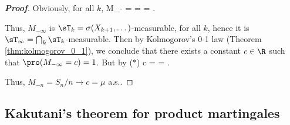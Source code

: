 \begin{proof}[\bf Proof]





Obviously, for all $k$,
\be
M_{-\infty} = \lim {} = \lim {} = \lim {}.
\ee

Thus, $M_{-\infty}$ is $\sT_k = \sigma(X_{k+1},\dots)$-measurable, for all $k$, hence it is $\sT_\infty = \bigcap_k \sT_k$-measurable. Then by Kolmogorov's 0-1 law (Theorem \ref{thm:kolmogorov_0_1}), we conclude that there exists a constant $c\in \R$ such that $\pro(M_{-\infty} =c) =1$. But by ($*$)
\be
c = \E{} = \mu.
\ee

Thus, $M_{-n} = S_n/n \to c = \mu$ a.s..
\end{proof}



\subsection{Kakutani's theorem for product martingales}

